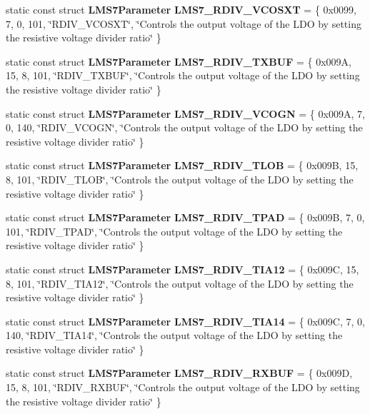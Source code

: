 \begin{DoxyCompactItemize}
\item 
static const struct {\bf L\+M\+S7\+Parameter} {\bf L\+M\+S7\+\_\+\+R\+D\+I\+V\+\_\+\+V\+C\+O\+S\+XT} = \{ 0x0099, 7, 0, 101, \char`\"{}\+R\+D\+I\+V\+\_\+\+V\+C\+O\+S\+X\+T\char`\"{}, \char`\"{}\+Controls the output voltage of the L\+D\+O by setting the resistive voltage divider ratio\char`\"{} \}
\item 
static const struct {\bf L\+M\+S7\+Parameter} {\bf L\+M\+S7\+\_\+\+R\+D\+I\+V\+\_\+\+T\+X\+B\+UF} = \{ 0x009\+A, 15, 8, 101, \char`\"{}\+R\+D\+I\+V\+\_\+\+T\+X\+B\+U\+F\char`\"{}, \char`\"{}\+Controls the output voltage of the L\+D\+O by setting the resistive voltage divider ratio\char`\"{} \}
\item 
static const struct {\bf L\+M\+S7\+Parameter} {\bf L\+M\+S7\+\_\+\+R\+D\+I\+V\+\_\+\+V\+C\+O\+GN} = \{ 0x009\+A, 7, 0, 140, \char`\"{}\+R\+D\+I\+V\+\_\+\+V\+C\+O\+G\+N\char`\"{}, \char`\"{}\+Controls the output voltage of the L\+D\+O by setting the resistive voltage divider ratio\char`\"{} \}
\item 
static const struct {\bf L\+M\+S7\+Parameter} {\bf L\+M\+S7\+\_\+\+R\+D\+I\+V\+\_\+\+T\+L\+OB} = \{ 0x009\+B, 15, 8, 101, \char`\"{}\+R\+D\+I\+V\+\_\+\+T\+L\+O\+B\char`\"{}, \char`\"{}\+Controls the output voltage of the L\+D\+O by setting the resistive voltage divider ratio\char`\"{} \}
\item 
static const struct {\bf L\+M\+S7\+Parameter} {\bf L\+M\+S7\+\_\+\+R\+D\+I\+V\+\_\+\+T\+P\+AD} = \{ 0x009\+B, 7, 0, 101, \char`\"{}\+R\+D\+I\+V\+\_\+\+T\+P\+A\+D\char`\"{}, \char`\"{}\+Controls the output voltage of the L\+D\+O by setting the resistive voltage divider ratio\char`\"{} \}
\item 
static const struct {\bf L\+M\+S7\+Parameter} {\bf L\+M\+S7\+\_\+\+R\+D\+I\+V\+\_\+\+T\+I\+A12} = \{ 0x009\+C, 15, 8, 101, \char`\"{}\+R\+D\+I\+V\+\_\+\+T\+I\+A12\char`\"{}, \char`\"{}\+Controls the output voltage of the L\+D\+O by setting the resistive voltage divider ratio\char`\"{} \}
\item 
static const struct {\bf L\+M\+S7\+Parameter} {\bf L\+M\+S7\+\_\+\+R\+D\+I\+V\+\_\+\+T\+I\+A14} = \{ 0x009\+C, 7, 0, 140, \char`\"{}\+R\+D\+I\+V\+\_\+\+T\+I\+A14\char`\"{}, \char`\"{}\+Controls the output voltage of the L\+D\+O by setting the resistive voltage divider ratio\char`\"{} \}
\item 
static const struct {\bf L\+M\+S7\+Parameter} {\bf L\+M\+S7\+\_\+\+R\+D\+I\+V\+\_\+\+R\+X\+B\+UF} = \{ 0x009\+D, 15, 8, 101, \char`\"{}\+R\+D\+I\+V\+\_\+\+R\+X\+B\+U\+F\char`\"{}, \char`\"{}\+Controls the output voltage of the L\+D\+O by setting the resistive voltage divider ratio\char`\"{} \}

\end{DoxyCompactItemize}
